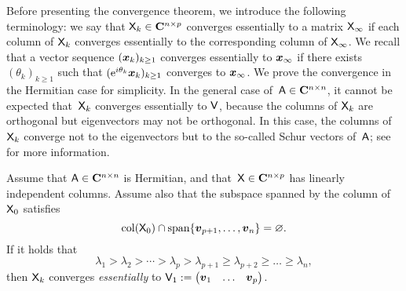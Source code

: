 Before presenting the convergence theorem,
we introduce the following terminology: we say that $\mathsf X_k \in \mathbf C^{n \times p}$ converges essentially to a matrix $\mathsf X_{\infty}$
if each column of $\mathsf X_k$ converges essentially to the corresponding column of $\mathsf X_{\infty}$.
We recall that a vector sequence $(\mathbf{\boldsymbol{x}}_k)_{k \geq 1}$ converges essentially to $\mathbf{\boldsymbol{x}}_{\infty}$ if there exists $(\theta_k)_{k \geq 1}$
such that $(\mathrm e^{i \theta_k} \mathbf{\boldsymbol{x}}_k)_{k \geq 1}$ converges to $\mathbf{\boldsymbol{x}}_{\infty}$.
We prove the convergence in the Hermitian case for simplicity.
In the general case of~$\mathsf A \in \mathbf C^{n \times n}$,
it cannot be expected that~$\mathsf X_k$ converges essentially to $\mathsf V$,
because the columns of $\mathsf X_k$ are orthogonal but eigenvectors may not be orthogonal.
In this case, the columns of $\mathsf X_k$ converge not to the eigenvectors
but to the so-called Schur vectors of~$\mathsf A$;
see~\cite{MR3396212} for more information.
\begin{theorem}
    \label{theorem:convergence_subspace_iteration}
    Assume that $\mathsf A \in \mathbf C^{n \times n}$ is Hermitian,
    and that~$\mathsf X \in \mathbf C^{n \times p}$ has linearly independent columns.
    Assume also that the subspace spanned by the column of~$\mathsf X_0$ satisfies
    \begin{equation}
        \label{eq:assumption_subspace_iteration}
        \operatorname{col}(\mathsf X_0) \cap \operatorname{span} \{ \mathbf{\boldsymbol{v}}_{p+1}, \dotsc, \mathbf{\boldsymbol{v}}_n \} = \varnothing.
    \end{equation}
    If it holds that
    \begin{equation}
        \label{eq:order_eigenvalues}
        \lambda_1 > \lambda_2 > \dotsb > \lambda_p > \lambda_{p+1} \geq \lambda_{p+2} \geq \dotsc \geq \lambda_n,
    \end{equation}
    then $\mathsf X_k$ converges \emph{essentially} to $\mathsf V_1 := \begin{pmatrix} \mathbf{\boldsymbol{v}}_1 & \hdots & \mathbf{\boldsymbol{v}}_p \end{pmatrix}$.
\end{theorem}
